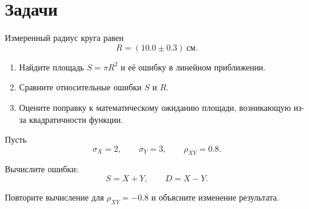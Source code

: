 \documentclass[
  russian,
  11pt,
  a4paper,
  open=any]{scrbook}
\providecommand{\tightlist}{%
  \setlength{\itemsep}{0pt}\setlength{\parskip}{0pt}}
\begin{document}
\section{Задачи}\label{ux437ux430ux434ux430ux447ux438-5}

\begin{semanticpdfbox}[colback=BookCoralSoft,borderline west={1.2mm}{0pt}{BookCoral}]

\par\nopagebreak[4]\vspace{1.2mm}

Измеренный радиус круга равен \[
R=(10.0\pm0.3)\ \text{см}.
\]

\begin{enumerate}
\def\labelenumi{\arabic{enumi}.}
\tightlist
\item
  Найдите площадь \(S=\pi R^2\) и её ошибку в линейном приближении.
\item
  Сравните относительные ошибки \(S\) и \(R\).
\item
  Оцените поправку к математическому ожиданию площади, возникающую из-за
  квадратичности функции.
\end{enumerate}

\end{semanticpdfbox}

\begin{semanticpdfbox}[colback=BookCoralSoft,borderline west={1.2mm}{0pt}{BookCoral}]

\par\nopagebreak[4]\vspace{1.2mm}

Пусть \[
\sigma_X=2,
\qquad
\sigma_Y=3,
\qquad
\rho_{XY}=0.8.
\]

Вычислите ошибки: \[
S=X+Y,
\qquad
D=X-Y.
\]

Повторите вычисление для \(\rho_{XY}=-0.8\) и объясните изменение
результата.

\end{semanticpdfbox}
\end{document}

